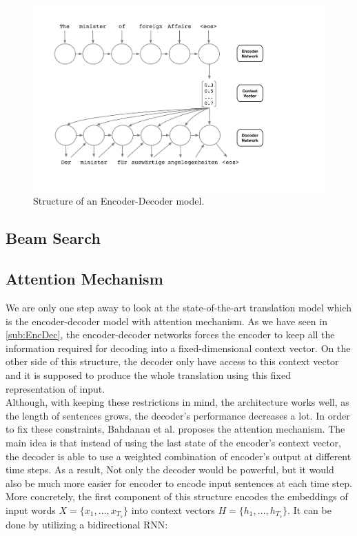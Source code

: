 \documentclass{sfuthesis}
\begin{document}
\begin{figure}[t]
\includegraphics[scale=0.15]{./images/EncDec0}
\caption{Structure of an Encoder-Decoder model.}
\label{fig:EncDec0}
\end{figure}

\subsection{Beam Search}

\subsection{Attention Mechanism} \label{sub:attention}
We are only one step away to look at the state-of-the-art translation model which is the encoder-decoder model with attention mechanism. As we have seen in \ref{sub:EncDec}, the encoder-decoder networks forces the encoder to keep all the information required for decoding into a fixed-dimensional context vector. On the other side of this structure, the decoder only have access to this context vector and it is supposed to produce the whole translation using this fixed representation of input.\\
Although, with keeping these restrictions in mind, the architecture works well, as the length of sentences grows, the decoder's performance decreases a lot. In order to fix these constraints, Bahdanau et al. \cite{Bahdanau:2014:Attention} proposes the attention mechanism. The main idea is that instead of using the last state of the encoder's context vector, the decoder is able to use a weighted combination of encoder's output at different time steps. As a result, Not only the decoder would be powerful, but it would also be much more easier for encoder to encode input sentences at each time step. \\
More concretely, the first component of this structure encodes the embeddings of input words $X=\{ x_1, \dots, x_{T_s} \}$ into context vectors $H = \{ h_1, \dots, h_{T_s} \}$. It can be done by utilizing a bidirectional RNN:
\end{document}
